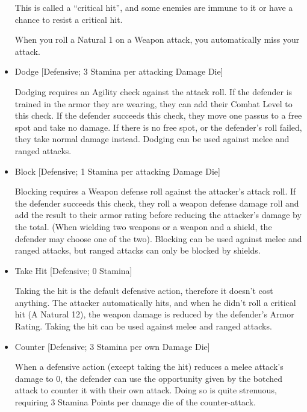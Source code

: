 \begin{itemize}
This is called a “critical hit”, and some enemies are immune to it or have a chance to resist a critical hit.

When you roll a Natural 1 on a Weapon attack, you automatically miss your attack.



\item Dodge [Defensive; 3 Stamina per attacking Damage Die]

Dodging requires an Agility check against the attack roll. If the defender is trained in the armor they are wearing, they can add their Combat Level to this check. If the defender succeeds this check, they move one passus to a free spot and take no damage. If there is no free spot, or the defender’s roll failed, they take normal damage instead. Dodging can be used against melee and ranged attacks.



\item Block [Defensive; 1 Stamina per attacking Damage Die]

Blocking requires a Weapon defense roll against the attacker's attack roll. If the defender succeeds this check, they roll a weapon defense damage roll and add the result to their armor rating before reducing the attacker’s damage by the total. (When wielding two weapons or a weapon and a shield, the defender may choose one of the two). Blocking can be used against melee and ranged attacks, but ranged attacks can only be blocked by shields.



\item Take Hit [Defensive; 0 Stamina]

Taking the hit is the default defensive action, therefore it doesn’t cost anything. The attacker automatically hits, and when he didn’t roll a critical hit (A Natural 12), the weapon damage is reduced by the defender’s Armor Rating. Taking the hit can be used against melee and ranged attacks.



\item Counter [Defensive; 3 Stamina per own Damage Die]

When a defensive action (except taking the hit) reduces a melee attack's damage to 0, the defender can use the opportunity given by the botched attack to counter it with their own attack. Doing so is quite strenuous, requiring 3 Stamina Points per damage die of the counter-attack.




\end{itemize}
